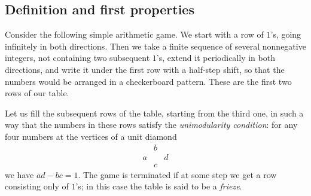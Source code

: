 \documentclass[a4paper,11pt]{amsart}
\theoremstyle{plain}
\theoremstyle{remark}
\theoremstyle{definition}
\newtheorem{definition}[theorem]{Definition}
\numberwithin{equation}{section}
\numberwithin{figure}{section}
\begin{document}
\subsection{Definition and first properties}\label{ssec:first}

Consider the following simple arithmetic game. We start with a row of $1$'s, going infinitely in both directions. Then we take a finite sequence of several nonnegative integers, not containing two subsequent $1$'s, extend it periodically in both directions, and write it under the first row with a half-step shift, so that the numbers would be arranged in a checkerboard pattern. These are the first two rows of our table.

Let us fill the subsequent rows of the table, starting  from the third one, in such a way that the numbers in these rows satisfy the \emph{unimodularity condition}: for any four numbers at the vertices of a unit diamond
\begin{equation}\label{eq:diamond}
\begin{array}{ccc}
&b&\\a &&d\\&c
\end{array}
\end{equation}
we have $ad-bc=1$. The game is terminated if at some step we get a row consisting only of $1$'s; in this case the table is said to be a \emph{frieze}.


\end{document}
